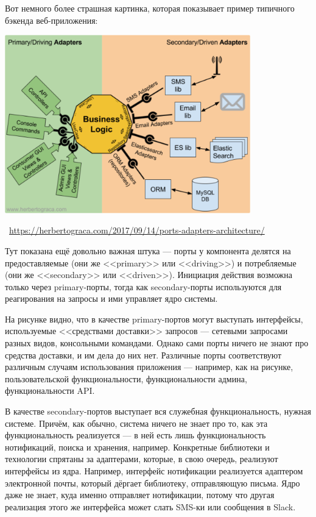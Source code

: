 \documentclass[a5paper]{article}
\newcommand{\attribution}[1] {
    \vspace{-4mm}\begin{flushright}\begin{scriptsize}\textcolor{gray}
    {\textcopyright\, #1}\end{scriptsize}\end{flushright}
}
\begin{document}
Вот немного более страшная картинка, которая показывает пример типичного бэкенда веб-приложения:

\begin{center}
    \includegraphics[width=0.8\textwidth]{hexagonalArchitectureDetails.png}
    \attribution{\url{https://herbertograca.com/2017/09/14/ports-adapters-architecture/}}
\end{center}

Тут показана ещё довольно важная штука --- порты у компонента делятся на предоставляемые (они же <<primary>> или <<driving>>) и потребляемые (они же <<secondary>> или <<driven>>). Инициация действия возможна только через primary-порты, тогда как secondary-порты используются для реагирования на запросы и ими управляет ядро системы.

На рисунке видно, что в качестве primary-портов могут выступать интерфейсы, используемые <<средствами доставки>> запросов --- сетевыми запросами разных видов, консольными командами. Однако сами порты ничего не знают про средства доставки, и им дела до них нет. Различные порты соответствуют различным случаям использования приложения --- например, как на рисунке, пользовательской функциональности, функциональности админа, функциональности API.

В качестве secondary-портов выступает вся служебная функциональность, нужная системе. Причём, как обычно, система ничего не знает про то, как эта функциональность реализуется --- в ней есть лишь функциональность нотификаций, поиска и хранения, например. Конкретные библиотеки и технологии спрятаны за адаптерами, которые, в свою очередь, реализуют интерфейсы из ядра. Например, интерфейс нотификации реализуется адаптером электронной почты, который дёргает библиотеку, отправляющую письма. Ядро даже не знает, куда именно отправляет нотификации, потому что другая реализация этого же интерфейса может слать SMS-ки или сообщения в Slack.
\end{document}
